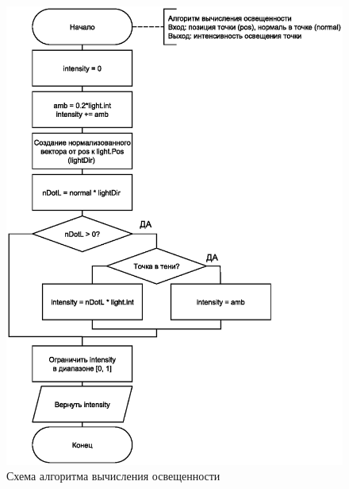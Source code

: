 \begin{figure}[h!]
    \centering
    \includegraphics[scale=0.45]{img/computelight.eps}
    \caption{Схема алгоритма вычисления освещенности}
    \label{fig}
\end{figure}

